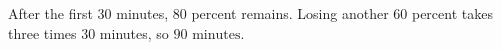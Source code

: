 After the first 30 minutes, 80 percent remains. Losing another 60 percent takes three times 30 minutes, so $\boxed{90\text{ minutes}}$.
